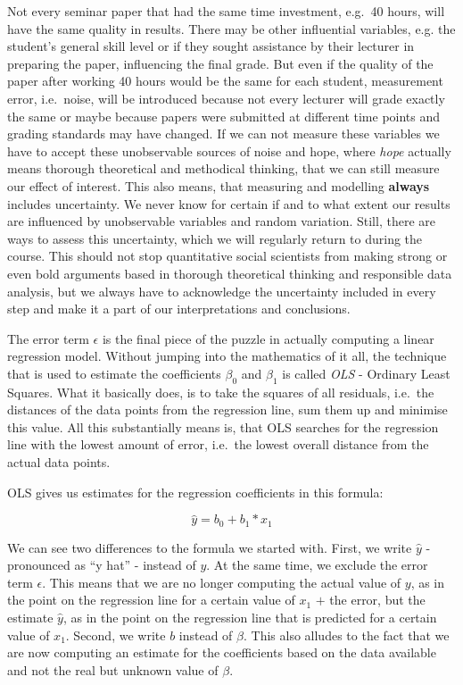 \documentclass[
]{book}
\begin{document}
Not every seminar paper that had the same time investment, e.g.~40 hours, will
have the same quality in results. There may be other influential variables, e.g.
the student's general skill level or if they sought assistance by their lecturer
in preparing the paper, influencing the final grade. But even if the quality of
the paper after working 40 hours would be the same for each student, measurement
error, i.e.~noise, will be introduced because not every lecturer will grade
exactly the same or maybe because papers were submitted at different time
points and grading standards may have changed. If we can not measure these
variables we have to accept these unobservable sources of noise and hope, where
\emph{hope} actually means thorough theoretical and methodical thinking, that we can
still measure our effect of interest. This also means, that measuring and
modelling \textbf{always} includes uncertainty. We never know for certain if and to
what extent our results are influenced by unobservable variables and random
variation. Still, there are ways to assess this uncertainty, which we will
regularly return to during the course. This should not stop quantitative
social scientists from making strong or even bold arguments based in thorough
theoretical thinking and responsible data analysis, but we always have to
acknowledge the uncertainty included in every step and make it a part of our
interpretations and conclusions.

The error term \(\epsilon\) is the final piece of the puzzle in actually computing
a linear regression model. Without jumping into the mathematics of it all, the
technique that is used to estimate the coefficients \(\beta_0\) and \(\beta_1\) is
called \emph{OLS} - Ordinary Least Squares. What it basically does, is to take the
squares of all residuals, i.e.~the distances of the data points from the
regression line, sum them up and minimise this value. All this substantially
means is, that OLS searches for the regression line with the lowest amount of error,
i.e.~the lowest overall distance from the actual data points.

OLS gives us estimates for the regression coefficients in this formula:

\[\hat{y} = b_0 +b_1*x_1\]

We can see two differences to the formula we started with. First, we write
\(\hat{y}\) - pronounced as ``y hat'' - instead of \(y\). At the same time, we exclude
the error term \(\epsilon\). This means that we are no longer computing the actual
value of \(y\), as in the point on the regression line for a certain value of
\(x_1\) \(+\) the error, but the estimate \(\hat{y}\), as in the point on the
regression line that is predicted for a certain value of \(x_1\). Second, we write
\(b\) instead of \(\beta\). This also alludes to the fact that we are now
computing an estimate for the coefficients based on the data available and not
the real but unknown value of \(\beta\).
\end{document}
